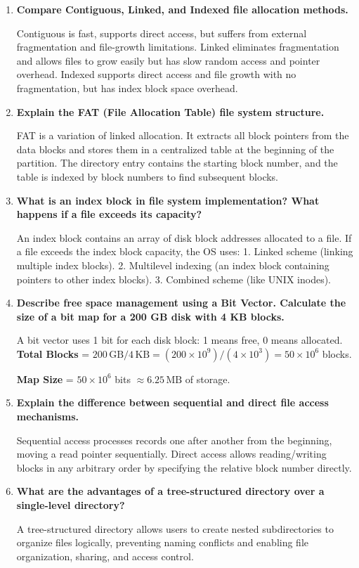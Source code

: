 \documentclass[12pt,a4paper]{article}
\newcommand{\Q}[1]{\textbf{#1}\par\noindent\ignorespaces}
\begin{document}
\begin{tcolorbox}[exambox, title={\textbf{Frequently Asked / Viva Questions}}]
\begin{enumerate}[topsep=0pt, label=\textbf{Q\arabic*.}, itemsep=5pt]
  \item \Q{Compare Contiguous, Linked, and Indexed file allocation methods.}
    Contiguous is fast, supports direct access, but suffers from external fragmentation and file-growth limitations. Linked eliminates fragmentation and allows files to grow easily but has slow random access and pointer overhead. Indexed supports direct access and file growth with no fragmentation, but has index block space overhead.
  \item \Q{Explain the FAT (File Allocation Table) file system structure.}
    FAT is a variation of linked allocation. It extracts all block pointers from the data blocks and stores them in a centralized table at the beginning of the partition. The directory entry contains the starting block number, and the table is indexed by block numbers to find subsequent blocks.
  \item \Q{What is an index block in file system implementation? What happens if a file exceeds its capacity?}
    An index block contains an array of disk block addresses allocated to a file. If a file exceeds the index block capacity, the OS uses: 1. Linked scheme (linking multiple index blocks). 2. Multilevel indexing (an index block containing pointers to other index blocks). 3. Combined scheme (like UNIX inodes).
  \item \Q{Describe free space management using a Bit Vector. Calculate the size of a bit map for a 200 GB disk with 4 KB blocks.}
    A bit vector uses 1 bit for each disk block: 1 means free, 0 means allocated.
    \textbf{Total Blocks} = $200\,\text{GB} / 4\,\text{KB} = (200 \times 10^9) / (4 \times 10^3) = 50 \times 10^6$ blocks.\par
    \textbf{Map Size} = $50 \times 10^6$ bits $\approx 6.25\,\text{MB}$ of storage.
  \item \Q{Explain the difference between sequential and direct file access mechanisms.}
    Sequential access processes records one after another from the beginning, moving a read pointer sequentially. Direct access allows reading/writing blocks in any arbitrary order by specifying the relative block number directly.
  \item \Q{What are the advantages of a tree-structured directory over a single-level directory?}
    A tree-structured directory allows users to create nested subdirectories to organize files logically, preventing naming conflicts and enabling file organization, sharing, and access control.

\end{enumerate}
\end{tcolorbox}
\end{document}
